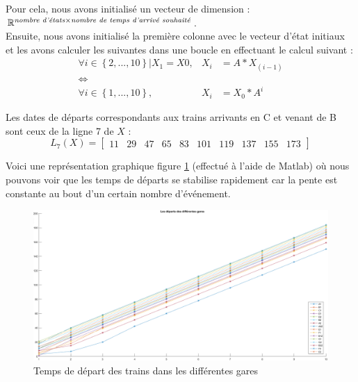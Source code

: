 Pour cela, nous avons initialisé un vecteur de dimension : $\mathbb{R}^{ \text{\emph{nombre d'états}} \times \text{\emph{nombre de temps d'arrivé souhaité}}}$.\\
Ensuite, nous avons initialisé la première colonne avec le vecteur d'état initiaux et les avons calculer les suivantes dans une boucle en effectuant le calcul suivant : 
\begin{eqnarray}
\forall i \in \left\lbrace 2, ..., 10\right\rbrace | X_1 = X0 ,&    X_{i}&=A*X_{(i-1)}\\
\Leftrightarrow&&\\
\forall i \in \left\lbrace 1, ..., 10\right\rbrace ,&    X_{i}&=X_0*A^i
\end{eqnarray}

Les dates de départs correspondants aux trains arrivants en C et venant de B sont ceux  de la ligne 7 de $X$ :
\begin{equation}
L_7(X)= \begin{bmatrix} 11&29&47&65&83&101&119&137&155&173 \end{bmatrix}
\end{equation}


Voici une représentation graphique figure \ref{fig:temps_arrivee} (effectué à l'aide de Matlab) où nous pouvons voir que les temps de départs se stabilise rapidement car la pente est constante au bout d'un certain nombre d'événement.
\begin{figure}[!ht]
\centering
\includegraphics[width = .7\textwidth]{./I/images/temps_departs.png}
\caption{\label{fig:temps_arrivee} Temps de départ des trains dans les différentes gares}
\end{figure}


